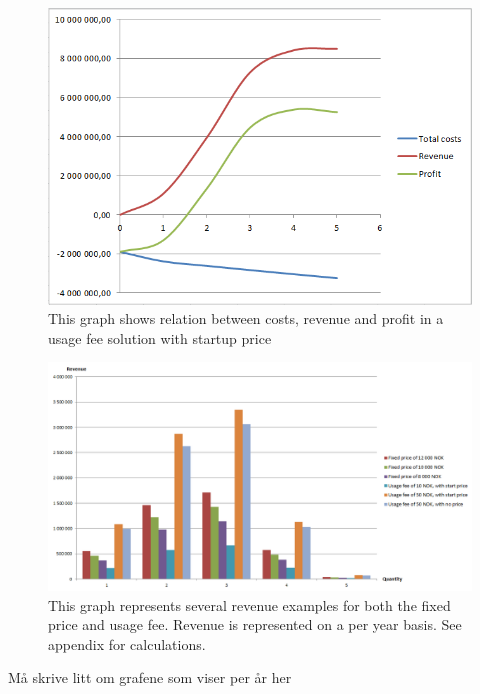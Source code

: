 \begin{figure}
\begin{center}
\includegraphics[scale=0.8]{profitusagefee}
\caption[Profit, Revenue and Cost for a Usage Fee Solution]{This graph shows relation between costs, revenue and profit in a usage fee solution with startup price}
\label{fig:ProfitUsageFee}
\end{center}
\end{figure}

\begin{figure}
\begin{center}
\includegraphics[angle=90,scale=0.5]{revenueall}
\caption[Revenue examples for both fixed price model and usage fee model]{This graph represents several revenue examples for both the fixed price and usage fee. Revenue is represented on a per year basis. See appendix for calculations.}
\label{fig:RevenueAll}
\end{center}
\end{figure}


Må skrive litt om grafene som viser per år her